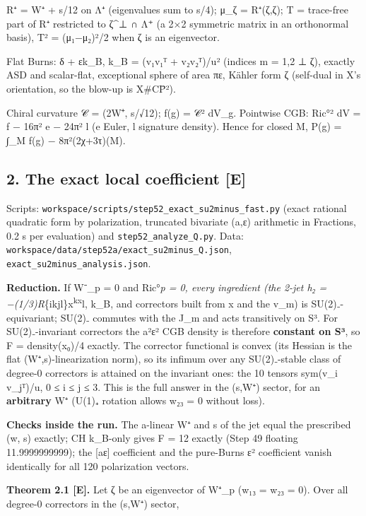 \documentclass[
  10pt,
]{report}
\begin{document}
R⁺ = W⁺ + s/12 on Λ⁺ (eigenvalues sum to s/4); μ\_ζ = R⁺(ζ,ζ); T =
trace-free part of R⁺ restricted to ζ\^{}⊥ ∩ Λ⁺ (a 2×2 symmetric matrix
in an orthonormal basis), \textbar T\textbar² = (μ₁−μ₂)²/2 when ζ is an
eigenvector.

Flat Burns: δ + εk\_B, k\_B = (v₁v₁ᵀ + v₂v₂ᵀ)/u² (indices m = 1,2 ⊥ ζ),
exactly ASD and scalar-flat, exceptional sphere of area πε, Kähler form
ζ (self-dual in X's orientation, so the blow-up is X\#CP̄²).

Chiral curvature 𝒞 = (2W⁺, s/√12); f(g) = \textbar 𝒞\textbar² dV\_g.
Pointwise CGB: \textbar Ric°\textbar² dV = f − 16π² e − 24π² l (e Euler,
l signature density). Hence for closed M, P(g) = ∫\_M f(g) −
8π²(2χ+3τ)(M).

\hypertarget{the-exact-local-coefficient-e}{%
\subsection{2. The exact local coefficient
{[}E{]}}\label{the-exact-local-coefficient-e}}

Scripts: \texttt{workspace/scripts/step52\_exact\_su2minus\_fast.py}
(exact rational quadratic form by polarization, truncated bivariate
(a,ε) arithmetic in Fractions, 0.2 s per evaluation) and
\texttt{step52\_analyze\_Q.py}. Data:
\texttt{workspace/data/step52a/exact\_su2minus\_Q.json},
\texttt{exact\_su2minus\_analysis.json}.

\textbf{Reduction.} If W⁻\_p = 0 and Ric°\emph{p = 0, every ingredient
(the 2-jet h₂ = −(1/3)R}\{ikjl\}x\textsuperscript{kx}l, k\_B, and
correctors built from x and the v\_m) is SU(2)₋-equivariant; SU(2)₋
commutes with the J\_m and acts transitively on S³. For SU(2)₋-invariant
correctors the a²ε² CGB density is therefore \textbf{constant on S³}, so
F = density(x₀)/4 exactly. The corrector functional is convex (its
Hessian is the flat (W⁺,s)-linearization norm), so its infimum over any
SU(2)₋-stable class of degree-0 correctors is attained on the invariant
ones: the 10 tensors sym(v\_i v\_jᵀ)/u, 0 ≤ i ≤ j ≤ 3. This is the full
answer in the (s,W⁺) sector, for an \textbf{arbitrary} W⁺ (U(1)₊
rotation allows w₂₃ = 0 without loss).

\textbf{Checks inside the run.} The a-linear W⁺ and s of the jet equal
the prescribed (w, s) exactly; CH k\_B-only gives F = 12 exactly (Step
49 floating 11.9999999999); the {[}aε{]} coefficient and the pure-Burns
ε² coefficient vanish identically for all 120 polarization vectors.

\textbf{Theorem 2.1 {[}E{]}.} Let ζ be an eigenvector of W⁺\_p (w₁₃ =
w₂₃ = 0). Over all degree-0 correctors in the (s,W⁺) sector,
\end{document}
